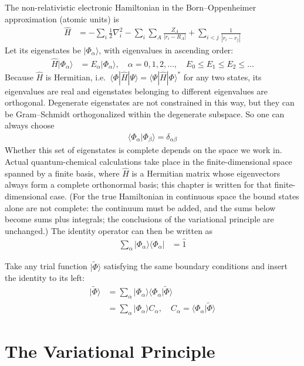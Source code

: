 The non-relativistic electronic Hamiltonian in the Born--Oppenheimer approximation (atomic units) is
\begin{align}\label{eq:Hel}
\hat{H} &= -\sum_i \frac{1}{2} \nabla_i^2 - \sum_i \sum_A \frac{Z_A}{|r_i - R_A|} + \sum_{i<j} \frac{1}{|r_i - r_j|}
\end{align}
Let its eigenstates be $|\Phi_{\alpha}\rangle$, with eigenvalues in ascending order:
\begin{align*}
\hat{H} |\Phi_\alpha\rangle &= E_\alpha |\Phi_\alpha\rangle, \quad \alpha = 0, 1, 2, \ldots, \quad E_0 \le E_1 \le E_2 \le \ldots
\end{align*}
Because $\hat{H}$ is Hermitian, i.e.\ $\langle \Phi|\hat{H}|\Psi\rangle = \langle \Psi|\hat{H}|\Phi\rangle^*$ for any two states, its eigenvalues are real and eigenstates belonging to different eigenvalues are orthogonal. Degenerate eigenstates are not constrained in this way, but they can be Gram--Schmidt orthogonalized within the degenerate subspace. So one can always choose
\begin{align*}
\langle \Phi_\alpha | \Phi_\beta \rangle = \delta_{\alpha\beta}
\end{align*}
Whether this set of eigenstates is complete depends on the space we work in. Actual quantum-chemical calculations take place in the finite-dimensional space spanned by a finite basis, where $\hat{H}$ is a Hermitian matrix whose eigenvectors always form a complete orthonormal basis; this chapter is written for that finite-dimensional case. (For the true Hamiltonian in continuous space the bound states alone are not complete: the continuum must be added, and the sums below become sums plus integrals; the conclusions of the variational principle are unchanged.) The identity operator can then be written as
\begin{align}\label{eq:completeness}
\sum_{\alpha} |\Phi_\alpha\rangle\langle\Phi_\alpha| &= \hat{1}
\end{align}

Take any trial function $|\tilde{\Phi}\rangle$ satisfying the same boundary conditions and insert the identity to its left:
\begin{align*}
|\tilde{\Phi}\rangle &= \sum_{\alpha} |\Phi_\alpha\rangle \langle\Phi_\alpha|\tilde{\Phi}\rangle \\
&= \sum_{\alpha} |\Phi_\alpha\rangle C_\alpha, \quad C_\alpha = \langle\Phi_\alpha|\tilde{\Phi}\rangle
\end{align*}

\section{The Variational Principle}

